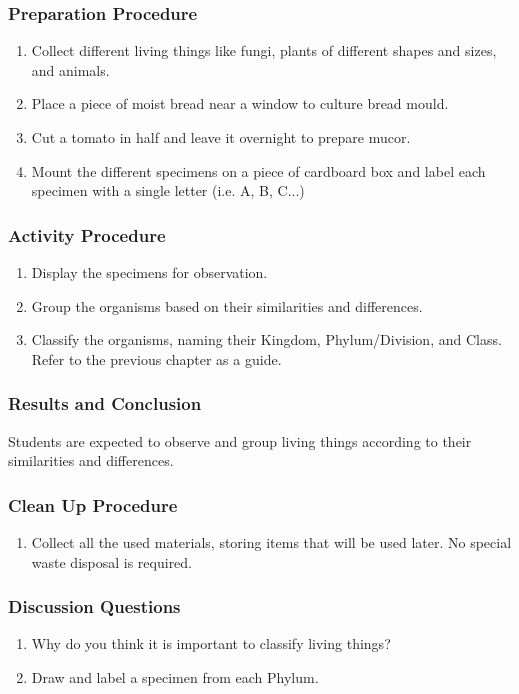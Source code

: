 \subsubsection*{Preparation Procedure}
\begin{enumerate}
\item{Collect different living things like fungi, plants of different shapes and sizes, and animals.}
\item{ Place a piece of moist bread near a window to culture bread mould.}
\item{ Cut a tomato in half and leave it overnight to prepare mucor.}
\item{Mount the different specimens on a piece of cardboard box and label each specimen with a single letter (i.e. A, B, C...)}
\end{enumerate}

\subsubsection*{Activity Procedure}
\begin{enumerate}
\item{Display the specimens for observation.}
\item{Group the organisms based on their similarities and differences.}
\item{Classify the organisms, naming their Kingdom, Phylum/Division, and Class. Refer to the previous chapter as a guide.}
\end{enumerate}

\subsubsection*{Results and Conclusion}
Students are expected to observe and group living things according to their similarities and differences.

\subsubsection*{Clean Up Procedure}
\begin{enumerate}
\item{Collect all the used materials, storing items that will be used later. No special waste disposal is required.}
\end{enumerate}

\subsubsection*{Discussion Questions}
\begin{enumerate}
\item{Why do you think it is important to classify living things?}
\item{Draw and label a specimen from each Phylum.}
\end{enumerate}


